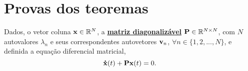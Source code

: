 \section{Provas dos teoremas}


\begin{myproofT}\label{proof:theo:differential-eq:order1:0}
Dados, o vetor coluna $\VECTOR{X} \in \mathbb{R}^N$, 
a \hyperref[def:diagonalization0]{\textbf{matriz diagonalizável}} $\MATRIX{P} \in \mathbb{R}^{N\times N}$,
com $N$ autovalores $\lambda_n$ e seus correspondentes autovetores $\VECTOR{v}_n$,
$\forall n \in \{1, 2, ..., N\}$, 
e definida a equação diferencial matricial,
\begin{equation}\label{eq:firstorder1}
\DTVECTOR{X}(t) + \MATRIX{P} \VECTOR{X}(t)=0.
\end{equation}


\end{myproofT}
